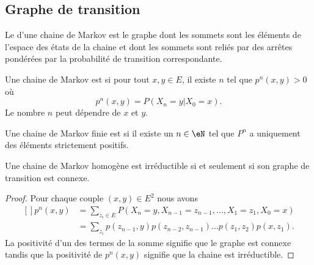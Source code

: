 \subsection{Graphe de transition}

Le  d'une chaine de Markov est le graphe dont les sommets sont les éléments de l'espace des états de la chaine et dont les sommets sont reliés par des arrêtes pondérées par la probabilité de transition correspondante.

\begin{definition}      \label{DEFooGKRQooFNuwRm}
	Une chaine de Markov est  si pour tout \( x,y\in E\), il existe \( n\) tel que \( p^n(x,y)>0\) où
	\begin{equation}
		p^n(x,y)=P(X_n=y|X_0=x).
	\end{equation}
	Le nombre \( n\) peut dépendre de \( x\) et \( y\).

	Une chaine de Markov finie est  si il existe un \( n\in \eN\) tel que \( P^n\) a uniquement des éléments strictement positifs.
\end{definition}

\begin{lemma}
	Une chaine de Markov homogène est irréductible si et seulement si son graphe de transition est connexe.
\end{lemma}

\begin{proof}
	Pour chaque couple \( (x,y)\in E^2\) nous avons
	\begin{equation}
		\begin{aligned}[]
			p^n(x,y) & =\sum_{z_i\in E}P(X_n=y,X_{n-1}=z_{n-1},\ldots,X_1=z_1,X_0=x)       \\
			         & =\sum_{z_i}p(z_{n-1},y)p(z_{n-2},z_{n-1})\ldots p(z_1,z_2)p(x,z_1).
		\end{aligned}
	\end{equation}
	La positivité d'un des termes de la somme signifie que le graphe est connexe tandis que la positivité de \( p^n(x,y)\) signifie que la chaine est irréductible.
\end{proof}

